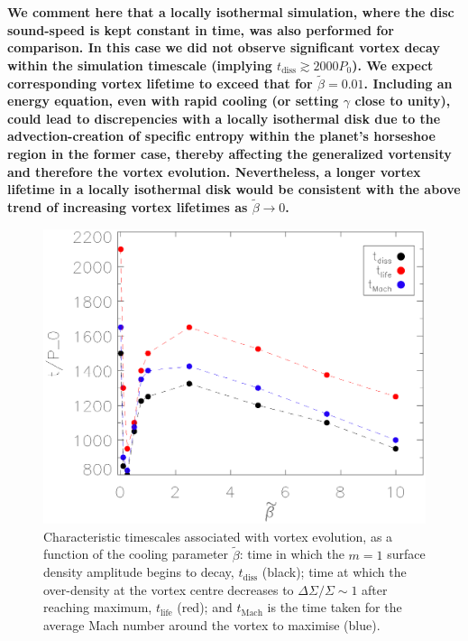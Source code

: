 {\bf We comment here that a locally isothermal simulation, where the
  disc sound-speed is kept constant in time, was also
  performed for comparison. In this case we did not observe
  significant vortex decay within the simulation timescale
 (implying $t_\mathrm{diss}\gtrsim2000P_0$).  We expect corresponding vortex
 lifetime to exceed that for $\tilde{\beta}=0.01$. Including an energy
 equation, even with rapid cooling (or setting $\gamma$ close to
 unity), could lead to discrepencies with a locally isothermal disk due to the
 advection-creation of specific entropy within the planet's horseshoe
 region in the former case,  thereby affecting the generalized vortensity 
 and therefore the vortex evolution. Nevertheless, a longer vortex
 lifetime in a locally isothermal disk would 
 be consistent with the above trend of increasing vortex lifetimes as
 $\tilde{\beta}\to0$. }  

\begin{figure}
  \includegraphics[width=\linewidth]{figures/betaplot}
  \caption{Characteristic timescales associated with vortex evolution, as a function of the cooling
    parameter $\tilde\beta$: time in which the $m=1$
    surface density amplitude begins to decay, $t_\mathrm{diss}$ (black);
    time at which the over-density at the
    vortex centre decreases to $\Delta\Sigma/\Sigma \sim 1$ after
    reaching maximum, $t_\mathrm{life}$ (red);
    and $t_\mathrm{Mach}$ is the time taken
    for the average Mach number around the vortex to maximise
    (blue). \label{betaplot}}  
\end{figure}

